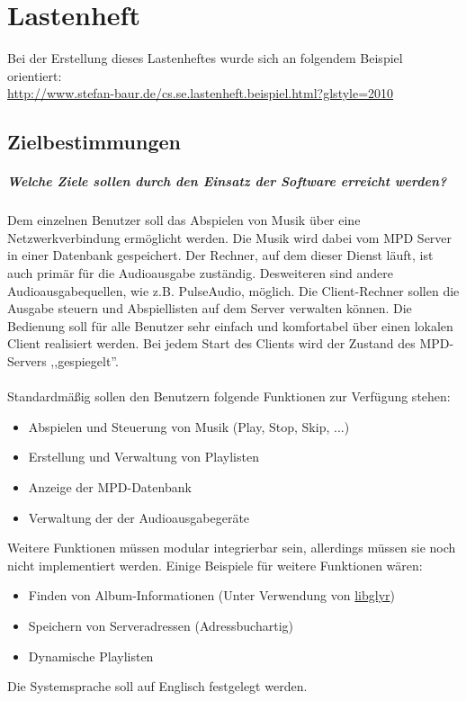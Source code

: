 \chapter{Lastenheft}
Bei der Erstellung dieses Lastenheftes wurde sich an folgendem Beispiel orientiert: \\
\url{http://www.stefan-baur.de/cs.se.lastenheft.beispiel.html?glstyle=2010}
\section{Zielbestimmungen}
\paragraph{Welche Ziele sollen durch den Einsatz der Software erreicht werden?}
Dem einzelnen Benutzer soll das Abspielen von Musik über eine Netzwerkverbindung ermöglicht werden. 
Die Musik wird dabei vom MPD Server in einer Datenbank gespeichert. Der Rechner, auf dem dieser
Dienst läuft, ist auch primär für die Audioausgabe zuständig. Desweiteren sind andere Audioausgabequellen,
wie z.B. PulseAudio, möglich.
Die Client-Rechner sollen die Ausgabe steuern und Abspiellisten auf dem Server verwalten
können. Die Bedienung soll für alle Benutzer sehr einfach und komfortabel über einen lokalen
Client realisiert werden. Bei jedem Start des Clients wird der Zustand des MPD-Servers ,,gespiegelt''.
\\ \\
Standardmäßig sollen den Benutzern folgende Funktionen zur Verfügung stehen:
\renewcommand{\labelitemi}{•}
\begin{itemize}
        \item Abspielen und Steuerung von Musik (Play, Stop, Skip, ...)
        \item Erstellung und Verwaltung von Playlisten
        \item Anzeige der MPD-Datenbank
        \item Verwaltung der der Audioausgabegeräte
\end{itemize}
Weitere Funktionen müssen modular integrierbar sein, allerdings müssen sie noch nicht implementiert
werden. Einige Beispiele für weitere Funktionen wären:
\begin{itemize}
    \item Finden von Album-Informationen (Unter Verwendung von \href{https://github.com/sahib/glyr}{libglyr})
	\item Speichern von Serveradressen (Adressbuchartig)
	\item Dynamische Playlisten
\end{itemize}
Die Systemsprache soll auf Englisch festgelegt werden.
